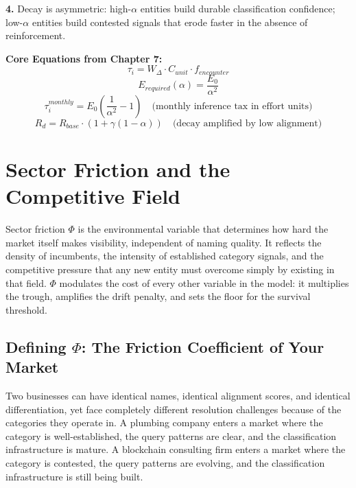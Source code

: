 \documentclass[12pt, openany]{book}
\theoremstyle{thmstyle}
\theoremstyle{defstyle}
\begin{document}
\textbf{4.} Decay is asymmetric: high-$\alpha$ entities build durable classification confidence; low-$\alpha$ entities build contested signals that erode faster in the absence of reinforcement.

\begin{equationbox}
\textbf{Core Equations from Chapter 7:}
\[
\tau_i = W_\Delta \cdot C_{unit} \cdot f_{encounter}
\]
\[
E_{required}(\alpha) = \frac{E_0}{\alpha^2}
\]
\[
\tau_i^{monthly} = E_0\left(\frac{1}{\alpha^2} - 1\right) \quad \text{(monthly inference tax in effort units)}
\]
\[
R_d = R_{base} \cdot (1 + \gamma(1-\alpha)) \quad \text{(decay amplified by low alignment)}
\]
\end{equationbox}

\chapter{Sector Friction and the Competitive Field}

\begin{keybox}
Sector friction $\Phi$ is the environmental variable that determines how hard the market itself makes visibility, independent of naming quality. It reflects the density of incumbents, the intensity of established category signals, and the competitive pressure that any new entity must overcome simply by existing in that field. $\Phi$ modulates the cost of every other variable in the model: it multiplies the trough, amplifies the drift penalty, and sets the floor for the survival threshold.
\end{keybox}

\section{Defining $\Phi$: The Friction Coefficient of Your Market}

Two businesses can have identical names, identical alignment scores, and identical differentiation, yet face completely different resolution challenges because of the categories they operate in. A plumbing company enters a market where the category is well-established, the query patterns are clear, and the classification infrastructure is mature. A blockchain consulting firm enters a market where the category is contested, the query patterns are evolving, and the classification infrastructure is still being built.
\end{document}
